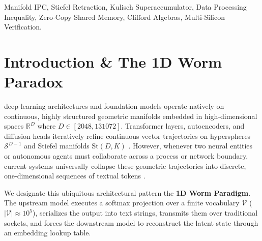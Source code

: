 \documentclass[journal,10pt,compsoc]{IEEEtran}
\theoremstyle{plain}
\theoremstyle{definition}
\begin{document}
\begin{IEEEkeywords}
Manifold IPC, Stiefel Retraction, Kulisch Superaccumulator, Data Processing Inequality, Zero-Copy Shared Memory, Clifford Algebras, Multi-Silicon Verification.
\end{IEEEkeywords}

\section{Introduction \& The 1D Worm Paradox}
\label{sec:intro}

 deep learning architectures and foundation models operate natively on continuous, highly structured geometric manifolds embedded in high-dimensional spaces $\mathbb{R}^D$ where $D \in [2048, 131072]$. Transformer layers, autoencoders, and diffusion heads iteratively refine continuous vector trajectories on hyperspheres $\mathcal{S}^{D-1}$ and Stiefel manifolds $\mathrm{St}(D, K)$ \cite{paszke2019pytorch, chen2018tvm}. However, whenever two neural entities or autonomous agents must collaborate across a process or network boundary, current systems universally collapse these geometric trajectories into discrete, one-dimensional sequences of textual tokens \cite{shannon1948mathematical}.

We designate this ubiquitous architectural pattern the \textbf{1D Worm Paradigm}. The upstream model executes a softmax projection over a finite vocabulary $\mathcal{V}$ ($|\mathcal{V}| \approx 10^5$), serializes the output into text strings, transmits them over traditional sockets, and forces the downstream model to reconstruct the latent state through an embedding lookup table.
\end{document}
